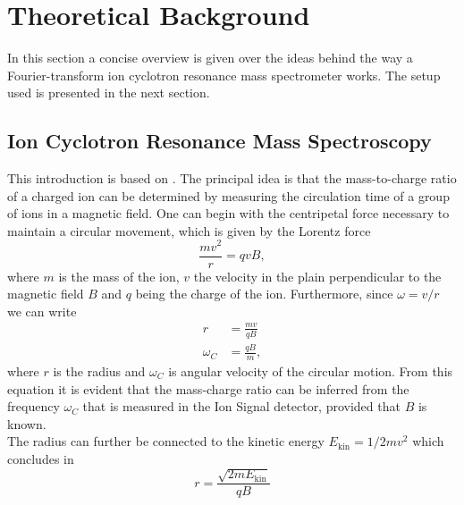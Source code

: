 \documentclass[a4paper,10pt]{article}
\begin{document}
\section{Theoretical Background}
\label{sec_theory}
In this section a concise overview is given over the ideas behind the way a Fourier-transform ion cyclotron resonance mass spectrometer works. The setup used is presented in the next section.

\subsection{Ion Cyclotron Resonance Mass Spectroscopy}
This introduction is based on \cite{primer}. The principal idea is that the mass-to-charge ratio of a charged ion can be determined by measuring the circulation time of a group of ions in a magnetic field. One can begin with the centripetal force necessary to maintain a circular movement, which is given by the Lorentz force
\begin{equation}
	\frac{m v^2}{r} = q v B,
\end{equation}
where $m$ is the mass of the ion, $v$ the velocity in the plain perpendicular to the magnetic field $B$ and $q$ being the charge of the ion. Furthermore, since $\omega = v/r$ we can write
\begin{equation}
	\label{omega}
	\begin{split}
		r &= \frac{m v}{q B} \\
		\omega_C &= \frac{q B}{m},
	\end{split}
\end{equation}
where $r$ is the radius and $\omega_C$ is angular velocity of the circular motion. From this equation it is evident that the mass-charge ratio can be inferred from the frequency $\omega_C$ that is measured in the Ion Signal detector, provided that $B$ is known.\\
The radius can further be connected to the kinetic energy $E_\mathrm{kin} = 1/2 m v^2$ which concludes in
\begin{equation}
	r = \frac{\sqrt{2 m E_\mathrm{kin}}}{qB}
\end{equation}
\end{document}

